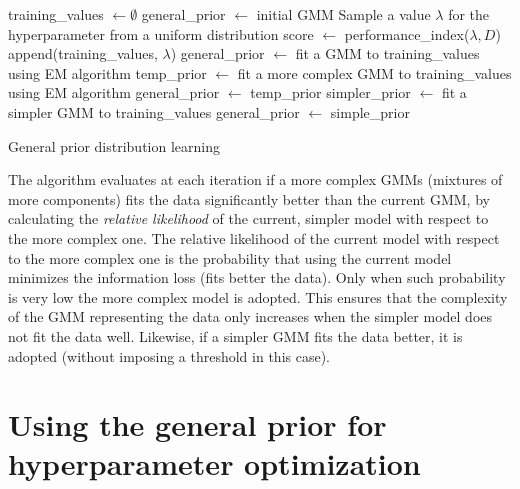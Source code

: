 	\begin{algorithm}[here]
		\begin{algorithmic}
				\State training\_values $\gets \emptyset$
				\State general\_prior $\gets$ initial GMM
						\State Sample a value $\lambda$ for the hyperparameter from a uniform
						distribution
						\State score $\gets$ performance\_index($\lambda, D$)
							\State append(training\_values, $\lambda$)
						\EndIf
						\State general\_prior $\gets$ fit a GMM to training\_values using EM algorithm
						\State temp\_prior $\gets$ fit a more complex GMM to training\_values
						using EM algorithm
							\State general\_prior $\gets$ temp\_prior
						\Else
							\State simpler\_prior $\gets$ fit a simpler GMM to training\_values
								\State general\_prior $\gets$ simple\_prior
							\EndIf
						\EndIf
					\EndWhile
				\EndFor
				\State
			\EndFunction
		\end{algorithmic}
		\caption{General prior distribution learning}
		\label{alg:general_prior}
	\end{algorithm}

	The algorithm evaluates at each iteration if a more complex GMMs (mixtures of more
	components) fits the data significantly better than the current GMM, by calculating the
	\emph{relative likelihood} of the current, simpler model with respect to the more complex one.
	The relative likelihood of the current model with respect to the more complex one is the
	probability that using the current model minimizes the information loss (fits better the data).
	Only when such probability is very low the more complex model is adopted. This ensures that the
	complexity of the GMM representing the data only increases when the simpler model does not fit
	the data well. Likewise, if a simpler GMM fits the data better, it is adopted (without imposing
	a threshold in this case).

	\section{Using the general prior for hyperparameter optimization}

